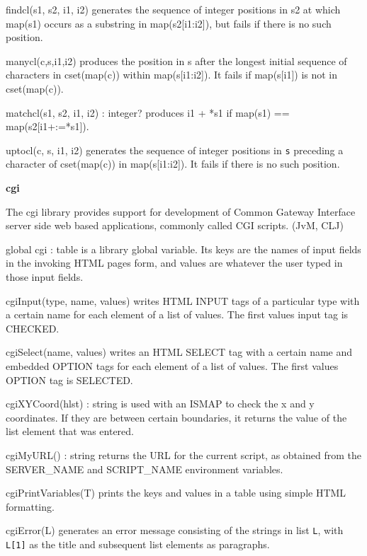 \textsf{findcl(s1, s2, i1, i2)} generates the sequence of integer
positions in \textsf{s2} at which \textsf{map(s1)} occurs as a
substring in \textsf{map(s2[i1:i2])}, but fails if there is no such
position.

\textsf{manycl(c,s,i1,i2)} produces the position in \textsf{s} after the
longest initial sequence of characters in \textsf{cset(map(c))} within
\textsf{map(s[i1:i2])}. It fails if \textsf{map(s[i1])} is not in
\textsf{cset(map(c))}.

\textsf{matchcl(s1, s2, i1, i2) : integer?} produces i1 + *s1 if map(s1)
== map(s2[i1+:=*s1]).

\textsf{uptocl(c, s, i1, i2)} generates the sequence of integer
positions in \texttt{s} preceding a character of \textsf{cset(map(c))}
in \textsf{map(s[i1:i2])}. It fails if there is no such position.

{\sffamily\bfseries
cgi}

The cgi library provides support for development of Common Gateway
Interface server side web based applications, commonly called
CGI scripts. (JvM, CLJ)

\textsf{global cgi : table} is a library global variable. Its keys are
the names of input fields in the invoking HTML page{\textquotesingle}s
form, and values are whatever the user typed in those input fields. 

\textsf{cgiInput(type, name, values)} writes HTML INPUT tags
of a particular type with a certain name for each element of a list of
values. The first value{\textquotesingle}s input tag is CHECKED. 

\textsf{cgiSelect(name, values)} writes an HTML SELECT tag with a
certain name and embedded OPTION tags for each element of a list of
values. The first value{\textquotesingle}s OPTION tag is SELECTED. 

\textsf{cgiXYCoord(hlst) : string} is used with an ISMAP to check the x
and y coordinates. If they are between certain boundaries, it returns
the value of the list element that was entered. 

\textsf{cgiMyURL() : string} returns the URL for the current script, as
obtained from the SERVER\_NAME and SCRIPT\_NAME environment variables. 

\textsf{cgiPrintVariables(T)} prints the keys and values in a table
using simple HTML formatting. 

\textsf{cgiError(L)} generates an error message consisting of the
strings in list \texttt{L}, with \texttt{L[1]} as the title and
subsequent list elements as paragraphs.

